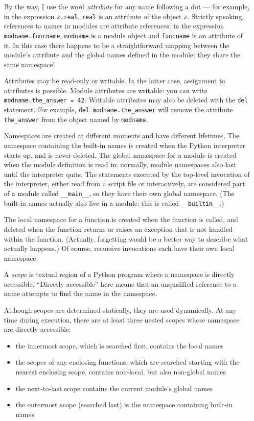 \documentclass[UTF8]{article}
\begin{document}
By the way, I use the word \emph{attribute} for any name following a dot --- for example, in the
expression \texttt{z.real}, \texttt{real} is an attribute of the object \texttt{z}. Strictly
speaking, references to names in modules are attribute references: in the expression
\texttt{modname.funcname}, \texttt{modname} is a module object and \texttt{funcname} is an
attribute of it. In this case there happens to be a straightforward mapping between the module's
attribute and the global names defined in the module: they share the same namespace!

Attributes may be read-only or writable. In the latter case, assignment to attributes is possible.
Module attributes are writable: you can write \texttt{modname.the\_answer = 42}. Writable attributes
may also be deleted with the \texttt{del} statement. For example, \texttt{del modname.the\_answer}
will remove the attribute \texttt{the\_answer} from the object named by \texttt{modname}.

Namespaces are created at different moments and have different lifetimes. The namespace containing
the built-in names is created when the Python interpreter starts up, and is never deleted. The
global namespace for a module is created when the module definition is read in; normally, module
namespaces also last until the interpreter quits. The statements executed by the top-level
invocation of the interpreter, either read from a script file or interactively, are considered part
of a module called \texttt{\_\_main\_\_}, so they have their own global namespace. (The built-in
names actually also live in a module; this is called \texttt{\_\_builtin\_\_}.)

The local namespace for a function is created when the function is called, and deleted when the
function returns or raises an exception that is not handled within the function. (Actually,
forgetting would be a better way to describe what actually happens.) Of course, recursive
invocations each have their own local namespace.

A \emph{scope} is textual region of a Python program where a namespace is directly accessible.
``Directly accessible'' here means that an unqualified reference to a name attempts to find the
name in the namespace.

Although scopes are determined statically, they are used dynamically. At any time during execution,
there are at least three nested scopes whose namespace are directly accessible:
\begin{itemize}
    \item the innermost scope, which is searched first, contains the local names
    \item the scopes of any enclosing functions, which are searched starting with the nearest
    enclosing scope, contains non-local, but also non-global names
    \item the next-to-last scope contains the current module's global names
    \item the outermost scope (searched last) is the namespace containing built-in names
\end{itemize}
\end{document}
